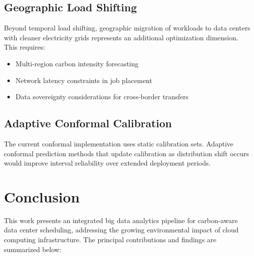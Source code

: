 \documentclass[12pt]{report}
\begin{document}
\subsection{Geographic Load Shifting}

Beyond temporal load shifting, geographic migration of workloads to data centers with cleaner electricity grids represents an additional optimization dimension. This requires:

\begin{itemize}
    \item Multi-region carbon intensity forecasting
    \item Network latency constraints in job placement
    \item Data sovereignty considerations for cross-border transfers
\end{itemize}

\subsection{Adaptive Conformal Calibration}

The current conformal implementation uses static calibration sets. Adaptive conformal prediction methods that update calibration as distribution shift occurs would improve interval reliability over extended deployment periods.

\section{Conclusion}

This work presents an integrated big data analytics pipeline for carbon-aware data center scheduling, addressing the growing environmental impact of cloud computing infrastructure. The principal contributions and findings are summarized below:
\end{document}
